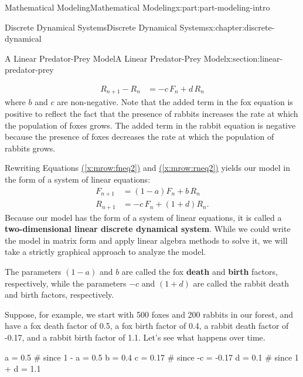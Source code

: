 \documentclass[oneside,10pt,]{book}
\newcommand{\xreffont}{\relax}
\newcommand{\terminology}[1]{\textbf{#1}}
\numberwithin{equation}{section}
\newcommand{\amp}{&}
\begin{document}
\begin{partptx}{Mathematical Modeling}{}{Mathematical Modeling}{}{}{x:part:part-modeling-intro}
\begin{chapterptx}{Discrete Dynamical Systems}{}{Discrete Dynamical Systems}{}{}{x:chapter:discrete-dynamical}
\begin{sectionptx}{A Linear Predator-Prey Model}{}{A Linear Predator-Prey Model}{}{}{x:section:linear-predator-prey}
\begin{introduction}{}
\begin{align}
R_{n+1} - R_n \amp= -c\,F_n + d\,R_n \label{x:mrow:rneq2}
\end{align}
where \(b\) and \(c\) are non-negative.  Note that the added term in the fox equation is positive to reflect the fact that the presence of rabbits increases the rate at which the population of foxes grows. The added term in the rabbit equation is negative because the presence of foxes decreases the rate at which the population of rabbits grows.%
\par
Rewriting Equations \hyperref[x:mrow:fneq2]{({\xreffont\ref{x:mrow:fneq2}})} and \hyperref[x:mrow:rneq2]{({\xreffont\ref{x:mrow:rneq2}})} yields our model in the form of a system of linear equations:%
%
\begin{align}
F_{n+1} \amp= (1-a)F_n + b\,R_n \label{x:mrow:fneq3}\\
R_{n+1} \amp= -c\,F_n + (1+d)R_n. \label{x:mrow:rneq3}
\end{align}
Because our model has the form of a system of linear equations, it is called a \terminology{two-dimensional linear discrete dynamical system}. While we could write the model in matrix form and apply linear algebra methods to solve it, we will take a strictly graphical approach to analyze the model.%
\par
The parameters \((1-a)\) and \(b\) are called the fox \terminology{death} and \terminology{birth} factors, respectively, while the parameters \(-c\) and \((1+d)\) are called the rabbit death and birth factors, respectively.%
\end{introduction}%
Suppose, for example, we start with 500 foxes and 200 rabbits in our forest, and have a fox death factor of 0.5, a fox birth factor of 0.4, a rabbit death factor of -0.17, and a rabbit birth factor of 1.1.  Let's see what happens over time.%
\begin{sageinput}
a = 0.5 # since 1 - a = 0.5
b = 0.4
c = 0.17 # since -c = -0.17
d = 0.1 # since 1 + d = 1.1


\end{sageinput}
\end{sectionptx}
\end{chapterptx}
\end{partptx}
\end{document}
